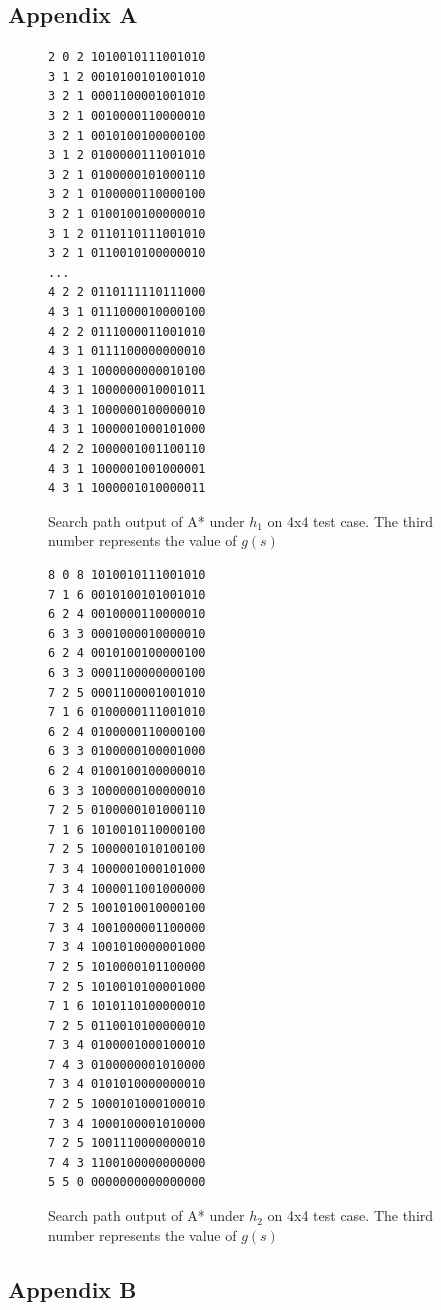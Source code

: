 \documentclass[runningheads]{llncs}
\begin{document}
\subsection{Appendix A}

\begin{figure}
\begin{center}
\begin{BVerbatim}
2 0 2 1010010111001010
3 1 2 0010100101001010
3 2 1 0001100001001010
3 2 1 0010000110000010
3 2 1 0010100100000100
3 1 2 0100000111001010
3 2 1 0100000101000110
3 2 1 0100000110000100
3 2 1 0100100100000010
3 1 2 0110110111001010
3 2 1 0110010100000010
...
4 2 2 0110111110111000
4 3 1 0111000010000100
4 2 2 0111000011001010
4 3 1 0111100000000010
4 3 1 1000000000010100
4 3 1 1000000010001011
4 3 1 1000000100000010
4 3 1 1000001000101000
4 2 2 1000001001100110
4 3 1 1000001001000001
4 3 1 1000001010000011
\end{BVerbatim}
\caption{Search path output of A* under $h_1$ on 4x4 test case. The third number represents the value of $g(s)$} \label{fig1}
\end{center}
\end{figure}

\newpage

\begin{figure}
\begin{center}
\begin{BVerbatim}
8 0 8 1010010111001010
7 1 6 0010100101001010
6 2 4 0010000110000010
6 3 3 0001000010000010
6 2 4 0010100100000100
6 3 3 0001100000000100
7 2 5 0001100001001010
7 1 6 0100000111001010
6 2 4 0100000110000100
6 3 3 0100000100001000
6 2 4 0100100100000010
6 3 3 1000000100000010
7 2 5 0100000101000110
7 1 6 1010010110000100
7 2 5 1000001010100100
7 3 4 1000001000101000
7 3 4 1000011001000000
7 2 5 1001010010000100
7 3 4 1001000001100000
7 3 4 1001010000001000
7 2 5 1010000101100000
7 2 5 1010010100001000
7 1 6 1010110100000010
7 2 5 0110010100000010
7 3 4 0100001000100010
7 4 3 0100000001010000
7 3 4 0101010000000010
7 2 5 1000101000100010
7 3 4 1000100001010000
7 2 5 1001110000000010
7 4 3 1100100000000000
5 5 0 0000000000000000
\end{BVerbatim}
\caption{Search path output of A* under $h_2$ on 4x4 test case. The third number represents the value of $g(s)$} \label{fig2}
\end{center}
\end{figure}

\newpage

\subsection{Appendix B}
\end{document}
